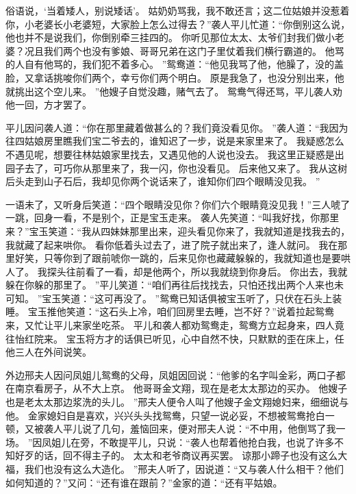 俗语说，‘当着矮人，别说矮话’。
姑奶奶骂我，我不敢还言；这二位姑娘并没惹着你，小老婆长小老婆短，大家脸上怎么过得去？”袭人平儿忙道：“你倒别这么说，他也并不是说我们，你倒别牵三挂四的。
你听见那位太太、太爷们封我们做小老婆？况且我们两个也没有爹娘、哥哥兄弟在这门子里仗着我们横行霸道的。
他骂的人自有他骂的，我们犯不着多心。
”鸳鸯道：“他见我骂了他，他臊了，没的盖脸，又拿话挑唆你们两个，幸亏你们两个明白。
原是我急了，也没分别出来，他就挑出这个空儿来。
”他嫂子自觉没趣，赌气去了。
鸳鸯气得还骂，平儿袭人劝他一回，方才罢了。
\par
平儿因问袭人道：“你在那里藏着做甚么的？我们竟没看见你。
”袭人道：“我因为往四姑娘房里瞧我们宝二爷去的，谁知迟了一步，说是来家里来了。
我疑惑怎么不遇见呢，想要往林姑娘家里找去，又遇见他的人说也没去。
我这里正疑惑是出园子去了，可巧你从那里来了，我一闪，你也没看见。
后来他又来了。
我从这树后头走到山子石后，我却见你两个说话来了，谁知你们四个眼睛没见我。
”\par
一语未了，又听身后笑道：“四个眼睛没见你？你们六个眼睛竟没见我！”三人唬了一跳，回身一看，不是别个，正是宝玉走来。
袭人先笑道：“叫我好找，你那里来？”宝玉笑道：“我从四妹妹那里出来，迎头看见你来了，我就知道是找我去的，我就藏了起来哄你。
看你低着头过去了，进了院子就出来了，逢人就问。
我在那里好笑，只等你到了跟前唬你一跳的，后来见你也藏藏躲躲的，我就知道也是要哄人了。
我探头往前看了一看，却是他两个，所以我就绕到你身后。
你出去，我就躲在你躲的那里了。
”平儿笑道：“咱们再往后找找去，只怕还找出两个人来也未可知。
”宝玉笑道：“这可再没了。
”鸳鸯已知话俱被宝玉听了，只伏在石头上装睡。
宝玉推他笑道：“这石头上冷，咱们回房里去睡，岂不好？”说着拉起鸳鸯来，又忙让平儿来家坐吃茶。
平儿和袭人都劝鸳鸯走，鸳鸯方立起身来，四人竟往怡红院来。
宝玉将方才的话俱已听见，心中自然不快，只默默的歪在床上，任他三人在外间说笑。
\par
外边邢夫人因问凤姐儿鸳鸯的父母，凤姐因回说：“他爹的名字叫金彩，两口子都在南京看房子，从不大上京。
他哥哥金文翔，现在是老太太那边的买办。
他嫂子也是老太太那边浆洗的头儿。
”邢夫人便令人叫了他嫂子金文翔媳妇来，细细说与他。
金家媳妇自是喜欢，兴兴头头找鸳鸯，只望一说必妥，不想被鸳鸯抢白一顿，又被袭人平儿说了几句，羞恼回来，便对邢夫人说：“不中用，他倒骂了我一场。
”因凤姐儿在旁，不敢提平儿，只说：“袭人也帮着他抢白我，也说了许多不知好歹的话，回不得主子的。
太太和老爷商议再买罢。
谅那小蹄子也没有这么大福，我们也没有这么大造化。
”邢夫人听了，因说道：“又与袭人什么相干？他们如何知道的？”又问：“还有谁在跟前？”金家的道：“还有平姑娘。
